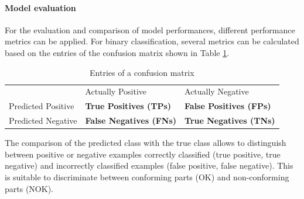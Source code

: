 \paragraph{Model evaluation}

For the evaluation and comparison of model performances, different performance metrics can be applied. For binary classification, several metrics can be calculated based on the entries of the confusion matrix shown in Table \ref{tab:confusion_matrix}.
%
\begin{table}
\caption{Entries of a confusion matrix}
\label{tab:confusion_matrix}
\begin{tabular}{l|l|l|}
\multicolumn{1}{l}{} & \multicolumn{1}{l}{Actually Positive}              & \multicolumn{1}{l}{Actually Negative}             \\ 
\cline{2-3}
\multicolumn{1}{l|}{Predicted Positive} & \textbf{True Positives (TPs)}  & \textbf{False Positives (FPs)} \\ 
\cline{2-3}
\multicolumn{1}{l|}{Predicted Negative} & \textbf{False Negatives (FNs)} & \textbf{True Negatives (TNs)}  \\ 
\cline{2-3}
\end{tabular}
\end{table}
%
The comparison of the predicted class with the true class allows to distinguish between positive or negative examples correctly classified (true positive, true negative) and incorrectly classified examples (false positive, false negative). This is suitable to discriminate between conforming parts (OK) and non-conforming parts (NOK). 

